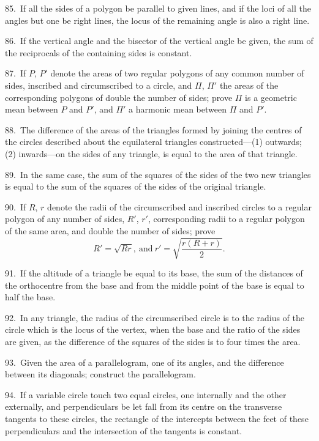 \documentclass[oneside]{book}
\begin{document}
\begin{footnotesize}
85.~If all the sides of a polygon be parallel to given lines, and
if the loci of all the angles but one be right lines, the locus of the
remaining angle is also a right line.

86.~If the vertical angle and the bisector of the vertical angle
be given, the sum of the reciprocals of the containing sides is
constant.

87.~If $P$, $P'$ denote the areas of two regular polygons of any
common number of sides, inscribed and circumscribed to a circle,
and $\Pi$, $\Pi'$ the areas of the corresponding polygons of double the
number of sides; prove $\Pi$ is a geometric mean between $P$ and $P'$,
and $\Pi'$ a harmonic mean between
$\Pi$ and $P'$.

88.~The difference of the areas of the triangles formed by joining
the centres of the circles described about the equilateral triangles
constructed---(1) outwards; (2) inwards---on the sides of
any triangle, is equal to the area of that triangle.

89.~In the same case, the sum of the squares of the sides of
the two new triangles is equal to the sum of the squares of the
sides of the original triangle.

90.~If $R$, $r$ denote the radii of the circumscribed and inscribed
circles to a regular polygon of any number of sides, $R'$, $r'$, corresponding
radii to a regular polygon of the same area, and double
the number of sides; prove
\[
R' = \sqrt{Rr},\ \text{and}\ r' = \sqrt{\frac{r(R+r)}{2}}.
\]

91.~If the altitude of a triangle be equal to its base, the sum
of the distances of the orthocentre from the base and from the
middle point of the base is equal to half the base.

92.~In any triangle, the radius of the circumscribed circle is to
the radius of the circle which is the locus of the vertex, when
the base and the ratio of the sides are given, as the difference of
the squares of the sides is to four times the area.

93.~Given the area of a parallelogram, one of its angles, and
the difference between its diagonals; construct the parallelogram.

94.~If a variable circle touch two equal circles, one internally
and the other externally, and perpendiculars be let fall from its
centre on the transverse tangents to these circles, the rectangle of
the intercepts between the feet of these perpendiculars and the
intersection of the tangents is constant.


\end{footnotesize}
\end{document}
